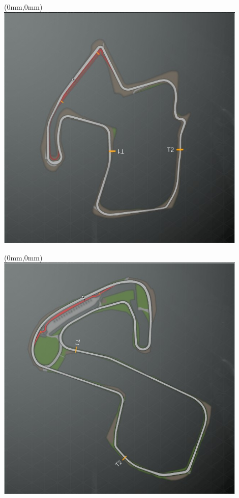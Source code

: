 \null\newpage
\begin{textblock*}{30mm}(0mm,0mm)%
\includegraphics[width=120mm]{TR/2015-05-21_00001.png}
\end{textblock*}
\null\newpage
\begin{textblock*}{30mm}(0mm,0mm)%
\includegraphics[width=120mm]{TR/2015-05-20_00007.png}
\end{textblock*}
